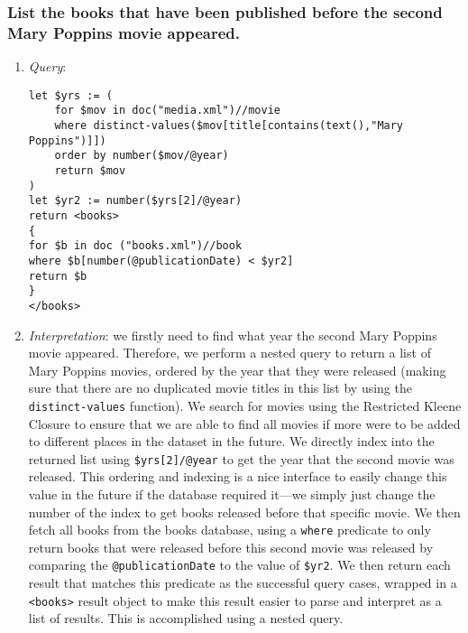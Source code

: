 \documentclass[11pt]{article}
\begin{document}
\begin{enumerate}
\end{enumerate}

\subsubsection{List the books that have been published before the second Mary Poppins movie appeared.}

\begin{enumerate}
\item \textit{Query}:
\begin{small}
\begin{verbatim}
let $yrs := (
    for $mov in doc("media.xml")//movie
    where distinct-values($mov[title[contains(text(),"Mary Poppins")]])
    order by number($mov/@year) 
    return $mov
) 
let $yr2 := number($yrs[2]/@year)
return <books>
{
for $b in doc ("books.xml")//book 
where $b[number(@publicationDate) < $yr2] 
return $b
}
</books>
\end{verbatim}
\end{small}
\item \textit{Interpretation}: we firstly need to find what year the second Mary Poppins movie appeared. Therefore, we perform a nested query to return a list of Mary Poppins movies, ordered by the year that they were released (making sure that there are no duplicated movie titles in this list by using the \texttt{distinct-values} function). We search for movies using the Restricted Kleene Closure to ensure that we are able to find all movies if more were to be added to different places in the dataset in the future. We directly index into the returned list using \texttt{\$yrs[2]/@year} to get the year that the second movie was released. This ordering and indexing is a nice interface to easily change this value in the future if the database required it---we simply just change the number of the index to get books released before that specific movie. We then fetch all books from the books database, using a \texttt{where} predicate to only return books that were released before this second movie was released by comparing the \texttt{@publicationDate} to the value of \texttt{\$yr2}. We then return each result that matches this predicate as the successful query cases, wrapped in a \texttt{<books>} result object to make this result easier to parse and interpret as a list of results. This is accomplished using a nested query.


\end{enumerate}
\end{document}
